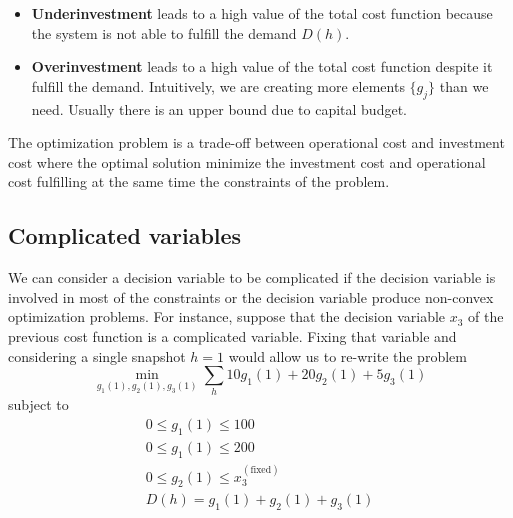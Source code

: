 \begin{itemize}
    \item \textbf{Underinvestment} leads to a high value of the total cost function because the system is not able to fulfill the demand $D(h)$.
    \item \textbf{Overinvestment} leads to a high value of the total cost function despite it fulfill the demand. Intuitively, we are creating more elements $\{g_{j}\}$ than we need. Usually there is an upper bound due to capital budget.
\end{itemize}
The optimization problem is a trade-off between operational cost and investment cost where the optimal solution minimize the investment cost and operational cost fulfilling at the same time the constraints of the problem.
\subsection{Complicated variables}
We can consider a decision variable to be complicated if the decision variable is involved in most of the constraints or the decision variable produce non-convex optimization problems. For instance, suppose that the decision variable $x_{3}$ of the previous cost function is a complicated variable. Fixing that variable and considering a single snapshot $h=1$ would allow us to re-write the problem 
\begin{equation}
    \min_{g_{1}(1), g_{2}(1), g_{3}(1)} \sum_{h}10g_{1}(1)+20g_{2}(1) + 5g_{3}(1)
\end{equation}
subject to
\begin{align}
    0 \leq g_{1}(1) \leq 100 \\
    0 \leq g_{1}(1) \leq 200 \\
    0 \leq g_{2}(1) \leq x_{3}^{(\text{fixed})} \\
    D(h) = g_{1}(1) + g_{2}(1) + g_{3}(1)
\end{align}
